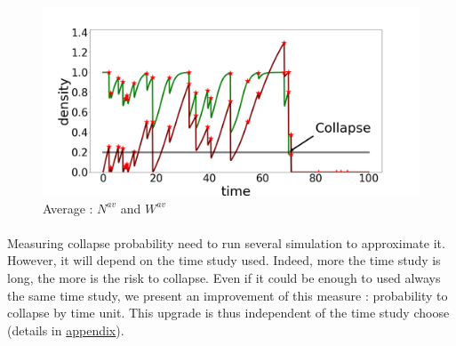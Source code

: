 \documentclass{article}
\begin{document}


\newpage

\begin{figure}[h!]
\centering
\includegraphics[width=10.cm]{time_series_cp_1.png}
\caption{Average : $N^{av}$ and $W^{av}$}
\end{figure}


\paragraph{}
Measuring collapse probability need to run several simulation to approximate it. However, it will depend on the time study used. Indeed, more the time study is long, the more is the risk to collapse. Even if it could be enough to used always the same time study, we present an improvement of this measure : probability to collapse by time unit. This upgrade is thus independent of the time study choose (details in \hyperref[proba_per_time_unit]{appendix}).
\end{document}
